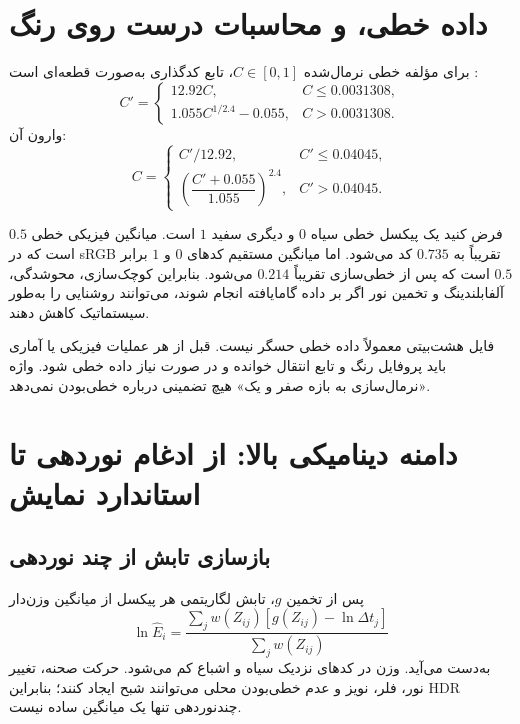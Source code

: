 \section{داده خطی،  و محاسبات درست روی رنگ}

برای مؤلفه خطی نرمال‌شده \(C\in[0,1]\)، تابع کدگذاری  به‌صورت قطعه‌ای است
\cite{iec61966srgb}:
\begin{equation}
C'=
\begin{cases}
12.92C,&C\le0.0031308,\\
1.055C^{1/2.4}-0.055,&C>0.0031308.
\end{cases}
\label{eq:srgb-oetf}
\end{equation}
وارون آن:
\begin{equation}
C=
\begin{cases}
C'/12.92,&C'\le0.04045,\\
\left(\dfrac{C'+0.055}{1.055}\right)^{2.4},&C'>0.04045.
\end{cases}
\label{eq:srgb-inverse}
\end{equation}

\begin{example}
فرض کنید یک پیکسل خطی سیاه \(0\) و دیگری سفید \(1\) است. میانگین فیزیکی خطی \(0.5\) است که در
sRGB تقریباً به \(0.735\) کد می‌شود. اما میانگین مستقیم کدهای \(0\) و \(1\) برابر \(0.5\) است که
پس از خطی‌سازی تقریباً \(0.214\) می‌شود. بنابراین کوچک‌سازی، محوشدگی، آلفا‌بلندینگ و تخمین نور
اگر بر داده گامایافته انجام شوند، می‌توانند روشنایی را به‌طور سیستماتیک کاهش دهند.
\end{example}

\begin{warningbox}
فایل هشت‌بیتی  معمولاً داده خطی حسگر نیست. قبل از هر عملیات فیزیکی یا آماری باید
پروفایل رنگ و تابع انتقال خوانده و در صورت نیاز داده خطی شود. واژه «نرمال‌سازی به بازه صفر و یک»
هیچ تضمینی درباره خطی‌بودن نمی‌دهد.
\end{warningbox}

\section{دامنه دینامیکی بالا: از ادغام نوردهی تا استاندارد نمایش}

\subsection{بازسازی تابش از چند نوردهی}

پس از تخمین \(g\)، تابش لگاریتمی هر پیکسل از میانگین وزن‌دار
\begin{equation}
\ln\widehat E_i=
\frac{\sum_j w(Z_{ij})[g(Z_{ij})-\ln\Delta t_j]}
{\sum_j w(Z_{ij})}
\label{eq:hdr-radiance}
\end{equation}
به‌دست می‌آید. وزن در کدهای نزدیک سیاه و اشباع کم می‌شود. حرکت صحنه، تغییر نور، فلر، نویز و
عدم خطی‌بودن محلی می‌توانند شبح ایجاد کنند؛ بنابراین HDR چندنوردهی تنها یک میانگین ساده نیست.


